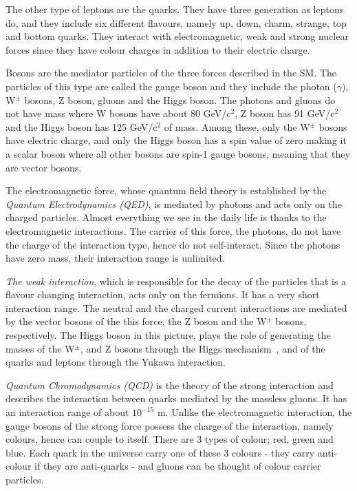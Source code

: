 The other type of leptons are the quarks. They have three generation as leptons do, and they include six different flavours, namely up, down, charm, strange, top and bottom quarks. They interact with electromagnetic, weak and strong nuclear forces since they have colour charges in addition to their electric charge. 

Bosons are the mediator particles of the three forces described in the SM. The particles of this type are called the gauge boson and they include the photon ($\gamma$), W$^{\pm}$ bosons, Z boson, gluons and the Higgs boson. The photons and gluons do not have mass where W bosons have about 80 GeV/c$^{2}$, Z boson has 91 GeV/c$^{2}$ and the Higgs boson has 125 GeV/c$^{2}$ of mass. Among these, only the W$^{\pm}$ bosons have electric charge, and only the Higgs boson has a spin value of zero making it a scalar boson where all other bosons are spin-1 gauge bosons, meaning that they are vector bosons.

The electromagnetic force, whose quantum field theory is established by the \emph{Quantum Electrodynamics (QED)}, is mediated by photons and acts only on the charged particles.  Almost everything we see in the daily life is thanks to the electromagnetic interactions. The carrier of this force, the photons, do not have the charge of the interaction type, hence do not self-interact. Since the photons have zero mass, their interaction range is unlimited.

\emph{The weak interaction}, which is responsible for the decay of the particles that is a flavour changing interaction, acts only on the fermions. It has a very short interaction range. The neutral and the charged current interactions are mediated by the vector bosons of the this force, the Z boson and the W$^{\pm}$ bosons, respectively. The Higgs boson in this picture, plays the role of generating the masses of the W$^{\pm}$, and Z bosons through the Higgs mechanism~\cite{Higgs1964, BroutEnglert, Guralnik1964}, and of the quarks and leptons through the Yukawa interaction\cite{Weinberg1967}.

\emph{Quantum Chromodynamics (QCD)} is the theory of the strong interaction and describes the interaction between quarks mediated by the massless gluons. It has an interaction range of about $10^{-15}$ m. Unlike the electromagnetic interaction, the gauge bosons of the strong force possess the charge of the interaction, namely colours, hence can couple to itself. There are 3 types of colour; red, green and blue. Each quark in the universe carry one of these 3 colours - they carry anti-colour if they are anti-quarks - and gluons can be thought of colour carrier particles.

